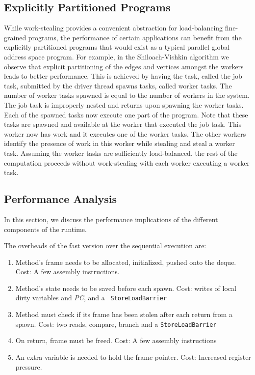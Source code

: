 \documentclass[10pt]{article}
\numberwithin{equation}{section}
\newcommand{\java}{\tt}
\begin{document}
\subsection{Explicitly Partitioned Programs}

While work-stealing provides a convenient abstraction for
load-balancing fine-grained programs, the performance of certain
applications can benefit from the explicitly partitioned programs that
would exist as a typical parallel global address space program. For
example, in the Shiloach-Vishkin algorithm we observe that explicit
partitioning of the edges and vertices amongst the workers leads to
better performance. This is achieved by having the task, called the
job task, submitted by the driver thread spawns tasks, called worker
tasks. The number of worker tasks spawned is equal to the number of
workers in the system. The job task is improperly nested and returns
upon spawning the worker tasks. Each of the spawned tasks now execute
one part of the program. Note that these tasks are spawned and
available at the worker that executed the job task. This worker now
has work and it executes one of the worker tasks. The other workers
identify the presence of work in this worker while stealing and steal
a worker task. Assuming the worker tasks are sufficiently
load-balanced, the rest of the computation proceeds without
work-stealing with each worker executing a worker task. 

\subsection{Performance Analysis}

In this section, we discuss the performance implications of the
different components of the runtime. 

The overheads of the fast version over the sequential execution are:

\begin{enumerate}
\item Method's frame needs to be allocated, initialized, pushed onto
  the deque. Cost: A few assembly instructions.
\item Method's state needs to be saved before each spawn. Cost: writes
  of local dirty variables and {\em PC}, and a {\java
  StoreLoadBarrier}
\item Method must check if its frame has been stolen after each
  return from a spawn. Cost: two reads, compare, branch and a 
  {\java StoreLoadBarrier} 
\item On return, frame must be freed. Cost: A few assembly instructions
\item An extra variable is needed to hold the frame pointer. Cost: Increased
  register pressure.
\end{enumerate}
\end{document}
